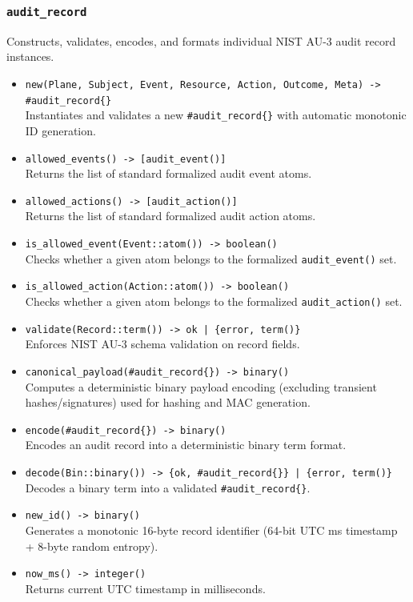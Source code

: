 \documentclass{article}
\begin{document}
\subsubsection{\texttt{audit\_record}}
Constructs, validates, encodes, and formats individual NIST AU-3 audit record instances.
\begin{itemize}
    \item \texttt{new(Plane, Subject, Event, Resource, Action, Outcome, Meta) -> \#audit\_record\{\}} \\
    Instantiates and validates a new \texttt{\#audit\_record\{\}} with automatic monotonic ID generation.
    \item \texttt{allowed\_events() -> [audit\_event()]} \\
    Returns the list of standard formalized audit event atoms.
    \item \texttt{allowed\_actions() -> [audit\_action()]} \\
    Returns the list of standard formalized audit action atoms.
    \item \texttt{is\_allowed\_event(Event::atom()) -> boolean()} \\
    Checks whether a given atom belongs to the formalized \texttt{audit\_event()} set.
    \item \texttt{is\_allowed\_action(Action::atom()) -> boolean()} \\
    Checks whether a given atom belongs to the formalized \texttt{audit\_action()} set.
    \item \texttt{validate(Record::term()) -> ok | \{error, term()\}} \\
    Enforces NIST AU-3 schema validation on record fields.
    \item \texttt{canonical\_payload(\#audit\_record\{\}) -> binary()} \\
    Computes a deterministic binary payload encoding (excluding transient hashes/signatures) used for hashing and MAC generation.
    \item \texttt{encode(\#audit\_record\{\}) -> binary()} \\
    Encodes an audit record into a deterministic binary term format.
    \item \texttt{decode(Bin::binary()) -> \{ok, \#audit\_record\{\}\} | \{error, term()\}} \\
    Decodes a binary term into a validated \texttt{\#audit\_record\{\}}.
    \item \texttt{new\_id() -> binary()} \\
    Generates a monotonic 16-byte record identifier (64-bit UTC ms timestamp + 8-byte random entropy).
    \item \texttt{now\_ms() -> integer()} \\
    Returns current UTC timestamp in milliseconds.
\end{itemize}
\end{document}
